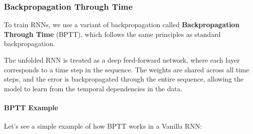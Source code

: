 \subsubsection{Backpropagation Through Time}
To train RNNs, we use a variant of backpropagation called \textbf{Backpropagation Through Time} (BPTT),
which follows the same principles as standard backpropagation.

The unfolded RNN is treated as a deep feed-forward network, where each layer corresponds to a time step in the sequence.
The weights are shared across all time steps, and the error is backpropagated through the entire sequence, allowing the model to learn from the temporal dependencies in the data.

\paragraph{BPTT Example}
Let's see a simple example of how BPTT works in a Vanilla RNN:
